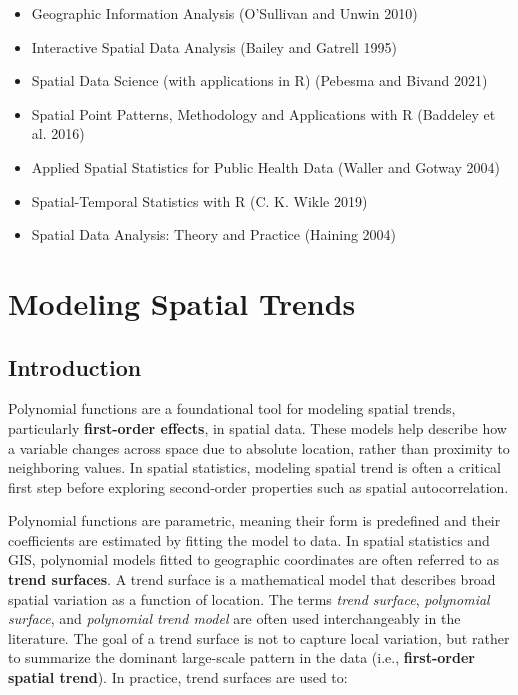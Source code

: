 \documentclass[
  letterpaper,
]{book}
\providecommand{\tightlist}{%
  \setlength{\itemsep}{0pt}\setlength{\parskip}{0pt}}
\begin{document}
\begin{itemize}
\tightlist
\item
  Geographic Information Analysis (O'Sullivan and Unwin 2010)
\item
  Interactive Spatial Data Analysis (Bailey and Gatrell 1995)
\item
  Spatial Data Science (with applications in R) (Pebesma and Bivand
  2021)
\item
  Spatial Point Patterns, Methodology and Applications with R (Baddeley
  et al. 2016)
\item
  Applied Spatial Statistics for Public Health Data (Waller and Gotway
  2004)
\item
  Spatial-Temporal Statistics with R (C. K. Wikle 2019)
\item
  Spatial Data Analysis: Theory and Practice (Haining 2004)
\end{itemize}

\chapter{Modeling Spatial Trends}\label{modeling-spatial-trends}

\section{Introduction}\label{introduction-11}

Polynomial functions are a foundational tool for modeling spatial
trends, particularly \textbf{first-order effects}, in spatial data.
These models help describe how a variable changes across space due to
absolute location, rather than proximity to neighboring values. In
spatial statistics, modeling spatial trend is often a critical first
step before exploring second-order properties such as spatial
autocorrelation.

Polynomial functions are parametric, meaning their form is predefined
and their coefficients are estimated by fitting the model to data. In
spatial statistics and GIS, polynomial models fitted to geographic
coordinates are often referred to as \textbf{trend surfaces}. A trend
surface is a mathematical model that describes broad spatial variation
as a function of location. The terms \emph{trend surface},
\emph{polynomial surface}, and \emph{polynomial trend model} are often
used interchangeably in the literature. The goal of a trend surface is
not to capture local variation, but rather to summarize the dominant
large-scale pattern in the data (i.e., \textbf{first-order spatial
trend}). In practice, trend surfaces are used to:
\end{document}
